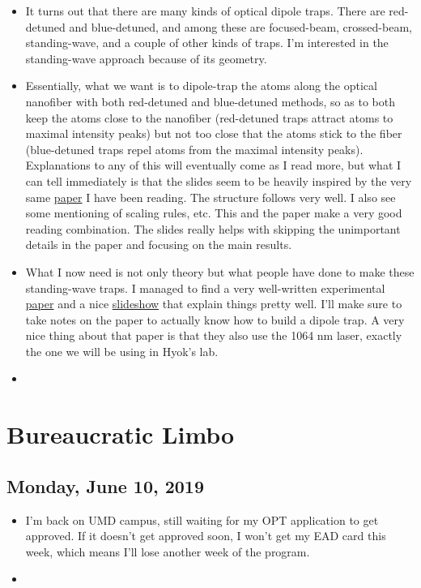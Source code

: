 \documentclass{report}
\theoremstyle{definition}
\begin{document}
\begin{itemize}
	\item It turns out that there are many kinds of optical dipole traps. There are red-detuned and blue-detuned, and among these are focused-beam, crossed-beam, standing-wave, and a couple of other kinds of traps. I'm interested in the standing-wave approach because of its geometry. 
	
	\item Essentially, what we want is to dipole-trap the atoms along the optical nanofiber with both red-detuned and blue-detuned methods, so as to both keep the atoms close to the nanofiber (red-detuned traps attract atoms to maximal intensity peaks) but not too close that the atoms stick to the fiber (blue-detuned traps repel atoms from the maximal intensity peaks). Explanations to any of this will eventually come as I read more, but what I can tell immediately is that the slides seem to be heavily inspired by the very same \href{https://arxiv.org/pdf/physics/9902072.pdf}{paper} I have been reading. The structure follows very well. I also see some mentioning of scaling rules, etc. This and the paper make a very good reading combination. The slides really helps with skipping the unimportant details in the paper and focusing on the main results. 
	
	\item What I now need is not only theory but what people have done to make these standing-wave traps. I managed to find a very well-written experimental \href{http://quantum-technologies.iap.uni-bonn.de/de/component/publications/?task=download\&file=69\&token=de46701d9e5eb9e185abc9784c3f8313}{paper} and a nice \href{https://www.mpq.mpg.de/5020867/0515b_atom_traps.pdf}{slideshow} that explain things pretty well. I'll make sure to take notes on the paper to actually know how to build a dipole trap. A very nice thing about that paper is that they also use the 1064 nm laser, exactly the one we will be using in Hyok's lab.
	
	
	
	\item 
\end{itemize}





\chapter{Bureaucratic Limbo}

\section{Monday, June 10, 2019}

\begin{itemize}
	\item I'm back on UMD campus, still waiting for my OPT application to get approved. If it doesn't get approved soon, I won't get my EAD card this week, which means I'll lose another week of the program.
	
	
	\item 
\end{itemize}
\end{document}
